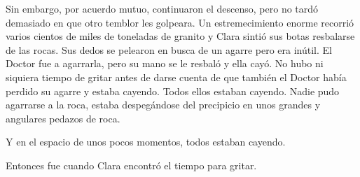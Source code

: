 {Sin embargo, por acuerdo mutuo, continuaron el descenso, pero no tardó
 demasiado en que otro temblor les golpeara. Un estremecimiento enorme
 recorrió varios cientos de miles de toneladas de granito y Clara sintió
 sus botas resbalarse de las rocas. Sus dedos se pelearon en busca de un
 agarre pero era inútil. El Doctor fue a agarrarla, pero su mano se le
 resbaló y ella cayó. No hubo ni siquiera tiempo de gritar antes de darse
 cuenta de que también el Doctor había perdido su agarre y estaba
 cayendo. Todos ellos estaban cayendo. Nadie pudo agarrarse a la roca,
 estaba despegándose del precipicio en unos grandes y angulares pedazos
de roca.}

{Y en el espacio de unos pocos momentos, todos estaban cayendo.}

{Entonces fue cuando Clara encontró el tiempo para gritar.}
